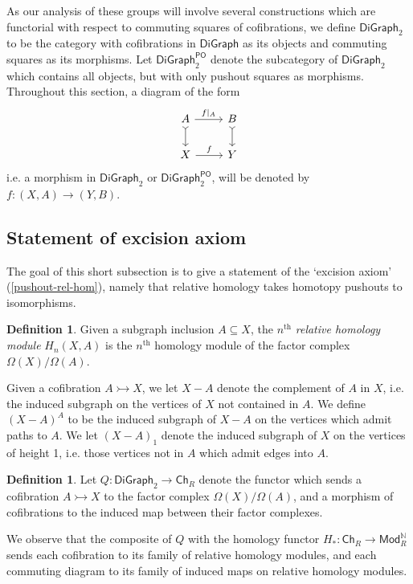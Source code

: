 \documentclass[11pt]{article}
\theoremstyle{definition}
\newtheorem{defi}[theo]{Definition}
\numberwithin{equation}{section}
\newcommand{\ModRN}{\mathsf{Mod}_R^{\mathbb{N}}}
\newcommand{\Ch}{\mathsf{Ch}}
\newcommand{\DiGraph}{\mathsf{DiGraph}}
\newcommand{\Cof}{\mathsf{DiGraph}_2}
\newcommand{\CofPO}{\mathsf{DiGraph}_2^{\mathsf{PO}}}
\newcommand{\W}{(X - A)_1}
\newcommand{\cto}{\rightarrowtail}
\begin{document}
As our analysis of these groups will involve several constructions which are functorial with respect to commuting squares of cofibrations, we define $\Cof$ to be the category with cofibrations in $\DiGraph$ as its objects and commuting squares as its morphisms. Let $\CofPO$ denote the subcategory of $\Cof$ which contains all objects, but with only pushout squares as morphisms. Throughout this section, a diagram of the form
\[
\begin{tikzcd}
A \arrow[r,"f|_A"] \arrow[d,tail] & B \arrow[d,tail] \\
X \arrow[r,"f"] & Y
\end{tikzcd}
\]
i.e.  a morphism in $\Cof$ or $\CofPO$, will be denoted by $f \colon (X,A) \to (Y,B)$.

\subsection{Statement of excision axiom}

The goal of this short subsection is to give a statement of the `excision axiom' (\cref{pushout-rel-hom}), namely that relative homology takes homotopy pushouts to isomorphisms.

\begin{defi}
Given a subgraph inclusion $A \subseteq X$, the $n^{\mathrm{th}}$ \emph{relative homology module} $H_{n}(X,A)$ is the $n^{\mathrm{th}}$ homology module of the factor complex $\Omega(X) / \Omega(A)$.
\end{defi}

Given a cofibration $A \cto X$, we let $X - A$ denote the complement of $A$ in $X$, i.e.  the induced subgraph on the vertices of $X$ not contained in $A$. We define $(X - A)^A$ to be the induced subgraph of $X - A$ on the vertices which admit paths to $A$. We let $\W$ denote the induced subgraph of $X$ on the vertices of height 1, i.e.  those vertices not in $A$ which admit edges into $A$. 

\begin{defi}
Let $Q \colon \Cof \to \Ch_R$ denote the functor which sends a cofibration $A \cto X$ to the factor complex $\Omega(X)/\Omega(A)$, and a morphism of cofibrations to the induced map between their factor complexes. 
\end{defi}

We observe that the composite of $Q$ with the homology functor $H_* \colon \Ch_R \to \ModRN$ sends each cofibration to its family of relative homology modules, and each commuting diagram to its family of induced maps on relative homology modules.
\end{document}
